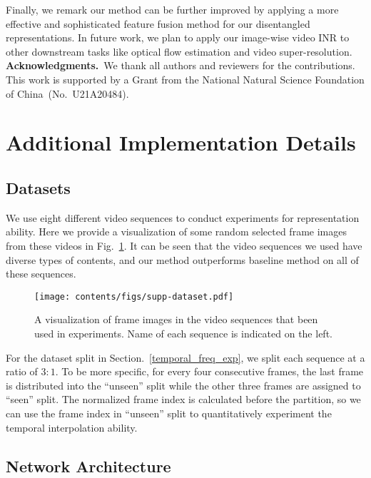\documentclass[runningheads]{llncs}
\begin{document}
Finally, we remark our method can be further improved by applying a more effective and sophisticated feature fusion method for our disentangled representations. In future work, we plan to apply our image-wise video INR to other downstream tasks like optical flow estimation and video super-resolution.
~\\

\noindent \textbf{Acknowledgments.}~We thank all authors and reviewers for the contributions. This work is supported by a Grant from the National Natural Science Foundation of China~(No.~U21A20484). 



\clearpage


\clearpage

\appendix
\section{Additional Implementation Details}

\subsection{Datasets}

We use eight different video sequences to conduct experiments for representation ability. Here we provide a visualization of some random selected frame images from these videos in Fig.~\ref{fig:dataset}. It can be seen that the video sequences we used have diverse types of contents, and our method outperforms baseline method on all of these sequences.

\begin{figure}[htbp]
    \centering
    \texttt{[image: contents/figs/supp-dataset.pdf]}
\caption{A visualization of frame images in the video sequences that been used in experiments. Name of each sequence is indicated on the left.}
    \label{fig:dataset}
\end{figure}

For the dataset split in Section.~\ref{temporal_freq_exp}, we split each sequence at a ratio of $3:1$. To be more specific, for every four consecutive frames, the last frame is distributed into the ``unseen'' split while the other three frames are assigned to ``seen'' split. The normalized frame index is calculated before the partition, so we can use the frame index in ``unseen'' split to quantitatively experiment the temporal interpolation ability.

\subsection{Network Architecture}
\label{supp-arch}
\end{document}
